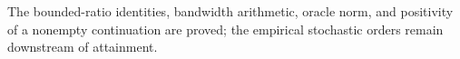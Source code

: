 The bounded-ratio identities, bandwidth arithmetic, oracle norm, and positivity of a nonempty continuation are proved; the empirical stochastic orders remain downstream of attainment.